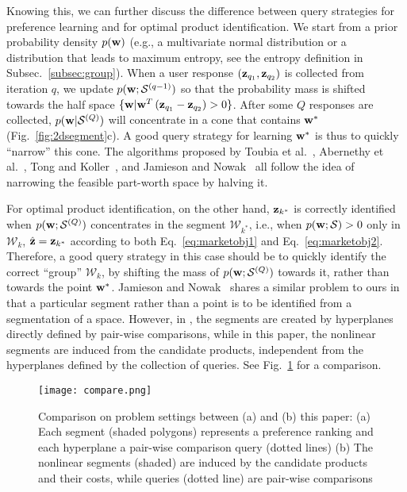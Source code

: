\documentclass[onecolumn,11pt]{article}
\begin{document}
Knowing this, we can further discuss the difference between query strategies for preference learning and for optimal product identification. We start from a prior probability density $p({\bf w})$ (e.g., a multivariate normal distribution or a distribution that leads to maximum entropy, see the entropy definition in Subsec.~\ref{subsec:group}). When a user response $({\bf z}_{q_1}, {\bf z}_{q_2})$ is collected from iteration $q$, we update $p({\bf w};\mathcal{S}^{(q-1)})$ so that the probability mass is shifted towards the half space $\{{\bf w}| {\bf w}^T\left({\bf z}_{q_1}-{\bf
z}_{q_2}\right)>0\}$. After some $Q$ responses are collected, $p({\bf
w}|\mathcal{S}^{(Q)})$ will concentrate in a cone that contains ${\bf w}^*$ (Fig.~\ref{fig:2dsegment}c). A good query strategy for learning ${\bf w}^*$ is thus to
quickly ``narrow'' this cone. 
The algorithms proposed by Toubia et al.~\cite{toubia2004polyhedral,toubia2003fast}, Abernethy et al.~\cite{abernethy2008eliciting}, Tong and Koller~\cite{tong2002support}, and Jamieson and Nowak~\cite{jamieson2011active} all follow the idea of narrowing the feasible part-worth space by halving it. 

For optimal product identification, on the other hand, ${\bf z}_{k^*}$ is correctly identified when $p({\bf w};\mathcal{S}^{(Q)})$ concentrates in the segment $\mathcal{W}_{k^*}$, i.e., when $p({\bf w};\mathcal{S})>0$ only in $\mathcal{W}_k$, $\hat{\bf z} = {\bf z}_{k^*}$ according to both Eq.~\eqref{eq:marketobj1} and Eq.~\eqref{eq:marketobj2}. Therefore, a good query strategy in this case should be to quickly identify the correct ``group'' $\mathcal{W}_k$, by shifting the mass of $p({\bf w};\mathcal{S}^{(Q)})$ towards it, rather than towards the point ${\bf w}^*$. Jamieson and Nowak~\cite{jamieson2011active} shares a similar problem to ours in that a particular segment rather than a point is to be identified from a segmentation of a space. However, in \cite{jamieson2011active}, the segments are created by hyperplanes directly defined by pair-wise comparisons, while in this paper, the nonlinear segments are induced from the candidate products, independent from the hyperplanes defined by the collection of queries. See Fig.~\ref{fig:compare} for a comparison.

\begin{figure}
\centering
\texttt{[image: compare.png]}
\caption{Comparison on problem settings between (a) \cite{jamieson2011active}  and (b) this paper: (a) Each segment (shaded polygons) represents a preference ranking and each hyperplane a pair-wise comparison query (dotted lines) (b) The nonlinear segments (shaded) are induced by the candidate products and their costs, while queries (dotted line) are pair-wise comparisons} 
\label{fig:compare}
\end{figure}
\end{document}
